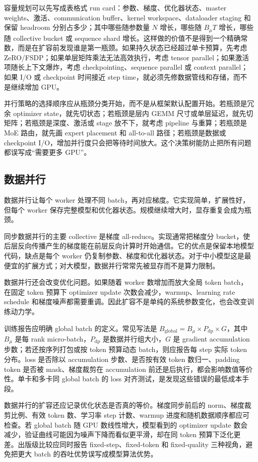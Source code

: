 \documentclass[UTF8,zihao=-4,openany]{ctexbook}
\begin{document}
容量规划可以先写成表格式 run card：参数、梯度、优化器状态、master weights、激活、communication buffer、kernel workspace、dataloader staging 和保留 headroom 分别占多少；其中哪些随参数量 $N$ 增长，哪些随 $B_{\mu}T$ 增长，哪些随 collective bucket 或 sequence shard 增长。这样做的价值不是得到一个精确常数，而是在扩容前发现谁是第一瓶颈。如果持久状态已经超过单卡预算，先考虑 ZeRO/FSDP；如果单层矩阵乘法无法高效执行，考虑 tensor parallel；如果激活项随长上下文爆炸，考虑 checkpointing、sequence parallel 或 context parallel；如果 I/O 或 checkpoint 时间接近 step time，就必须先修数据管线和存储，而不是继续增加 GPU。

并行策略的选择顺序应从瓶颈分类开始，而不是从框架默认配置开始。若瓶颈是冗余 optimizer state，就先切状态；若瓶颈是层内 GEMM 尺寸或单层延迟，就先切矩阵；若瓶颈是深度、激活或 stage 放不下，就考虑 pipeline 与重算；若瓶颈是 MoE 路由，就先画 expert placement 和 all-to-all 路径；若瓶颈是数据或 checkpoint I/O，增加并行度只会把等待时间放大。这个决策树能防止把所有问题都误写成“需要更多 GPU”。

\subsection{数据并行}
数据并行让每个 worker 处理不同 batch，再对应梯度。它实现简单，扩展性好，但每个 worker 保存完整模型和优化器状态。规模继续增大时，显存重复会成为瓶颈。

同步数据并行的主要 collective 是梯度 all-reduce。实现通常把梯度分 bucket，使后层反向传播产生的梯度能在前层反向计算时开始通信。它的优点是保留本地模型代码，缺点是每个 worker 仍复制参数、梯度和优化器状态。对于中小模型这是最便宜的扩展方式；对大模型，数据并行常常先被显存而不是算力限制。

数据并行还会改变优化问题。如果随着 worker 数增加而放大全局 token batch，在固定 token 预算下 optimizer update 次数会减少，warmup、learning rate schedule 和梯度噪声都需要重调。因此扩容不是单纯的系统参数变化，也会改变训练动力学。

训练报告应明确 global batch 的定义。常见写法是 $B_{\mathrm{global}}=B_{\mu}\times P_{\mathrm{dp}}\times G$，其中 $B_{\mu}$ 是每 rank micro-batch，$P_{\mathrm{dp}}$ 是数据并行组大小，$G$ 是 gradient accumulation 步数；若还按序列打包或按 token 预算动态 batch，则应报告每 step 实际 token 分布。loss 是否除以 accumulation 步数、是否按有效 token 数归一、padding token 是否被 mask、梯度裁剪在 accumulation 前还是后执行，都会影响数值等价性。单卡和多卡同 global batch 的 loss 对齐测试，是发现这些错误的最低成本手段。

数据并行的扩容还应记录优化状态是否真的等价。梯度同步前后的 norm、梯度裁剪比例、有效 token 数、学习率 step 计数、warmup 进度和随机数据顺序都应可检查。若 global batch 随 GPU 数线性增大，模型看到的 optimizer update 数会减少，验证曲线可能因为噪声下降而看似更平滑，却在同 token 预算下泛化更差。出版级比较应同时报告 fixed-step、fixed-token 和 fixed-quality 三种视角，避免把更大 batch 的吞吐优势误写成模型算法优势。
\end{document}
